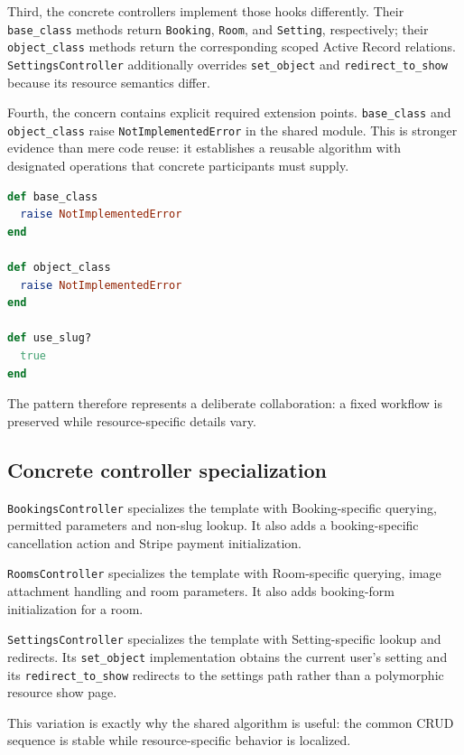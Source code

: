 \documentclass[10pt,a4paper]{article}
\newcommand{\code}[1]{\texttt{\small #1}}
\begin{document}
Third, the concrete controllers implement those hooks differently. Their \code{base\_class} methods return \code{Booking}, \code{Room}, and \code{Setting}, respectively; their \code{object\_class} methods return the corresponding scoped Active Record relations. \code{SettingsController} additionally overrides \code{set\_object} and \code{redirect\_to\_show} because its resource semantics differ.

Fourth, the concern contains explicit required extension points. \code{base\_class} and \code{object\_class} raise \code{NotImplementedError} in the shared module. This is stronger evidence than mere code reuse: it establishes a reusable algorithm with designated operations that concrete participants must supply.

\begin{lstlisting}[language=Ruby,caption={Verified baseline Template Method hook structure}]
def base_class
  raise NotImplementedError
end

def object_class
  raise NotImplementedError
end

def use_slug?
  true
end
\end{lstlisting}

The pattern therefore represents a deliberate collaboration: a fixed workflow is preserved while resource-specific details vary.

\subsection{Concrete controller specialization}

\code{BookingsController} specializes the template with Booking-specific querying, permitted parameters and non-slug lookup. It also adds a booking-specific cancellation action and Stripe payment initialization.

\code{RoomsController} specializes the template with Room-specific querying, image attachment handling and room parameters. It also adds booking-form initialization for a room.

\code{SettingsController} specializes the template with Setting-specific lookup and redirects. Its \code{set\_object} implementation obtains the current user's setting and its \code{redirect\_to\_show} redirects to the settings path rather than a polymorphic resource show page.

This variation is exactly why the shared algorithm is useful: the common CRUD sequence is stable while resource-specific behavior is localized.
\end{document}
